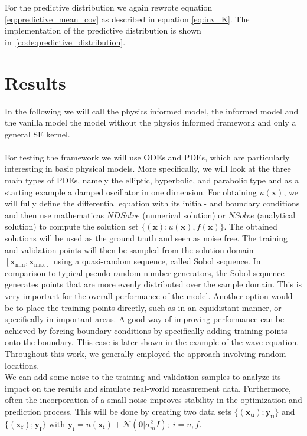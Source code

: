 \documentclass{article}
\begin{document}
For the predictive distribution we again rewrote equation \ref{eq:predictive_mean_cov} as described in equation \ref{eq:inv_K}. The implementation of the predictive distribution is shown in~\ref{code:predictive_distribution}.\\

\newpage
\section{Results}
In the following we will call the physics informed model, the
informed model and the vanilla model the model without the physics informed
framework and only a general SE kernel.\\ 
\\ For testing the framework we will
use ODEs and PDEs, which are particularly interesting in basic physical models. More specifically, we will look at the
three main types of PDEs, namely the elliptic, hyperbolic, and parabolic type and as a starting example a damped oscillator in one dimension. For obtaining
$u(\bm{x})$, we will fully define the differential equation with its initial-
and boundary conditions and then use mathematicas $NDSolve$ (numerical solution)
or $NSolve$ (analytical solution) to compute the solution set
$\{(\bm{x});u(\bm{x}),f(\bm{x})\}$. The obtained solutions will be used as the ground truth and seen as noise free. The training and validation points will then be sampled from the solution domain $[\bm{x}_{\min}, \bm{x}_{\max}]$ using a quasi-random sequence, called Sobol sequence. In comparison to typical pseudo-random number generators, the Sobol sequence generates points that are more evenly distributed over the sample domain. This is very important for the overall performance of the model. Another option would be to place the training points directly, such as in an equidistant manner, or specifically in important areas. A good way of improving performance can be achieved by forcing boundary conditions by specifically adding training points onto the boundary. This case is later shown in the example of the wave equation. Throughout this work, we generally employed the approach involving random locations. \\
We can add some noise to the training and validation samples to analyze its impact on the results and simulate real-world measurement data. Furthermore, often the incorporation of a small noise improves stability in the optimization and prediction process. This will be done by creating two data sets $\{(\bm{x_u});\bm{y_u}\}$ and $\{(\bm{x_f});\bm{y_f}\}$ with $\bm{y_i} = u(\bm{x_i}) + \mathcal{N}(\bm{0}|\sigma_{ni}^2 I) ; \; i = u,f$. \\
\end{document}
